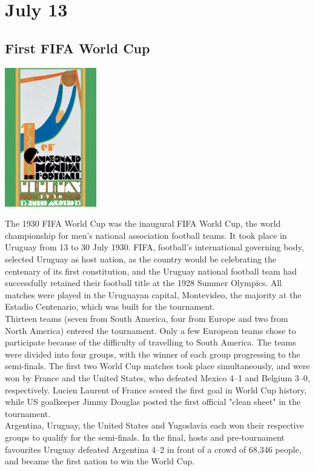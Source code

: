 \documentclass[11pt]{report}
\begin{document}
\section{July 13}
\subsection{First FIFA World Cup}
\vspace{2mm}\begin{center}\includegraphics[width=4cm]{./img/fifa1930.jpg}\end{center}
The 1930 FIFA World Cup was the inaugural FIFA World Cup, the world championship for men's national association football teams. It took place in Uruguay from 13 to 30 July 1930. FIFA, football's international governing body, selected Uruguay as host nation, as the country would be celebrating the centenary of its first constitution, and the Uruguay national football team had successfully retained their football title at the 1928 Summer Olympics. All matches were played in the Uruguayan capital, Montevideo, the majority at the Estadio Centenario, which was built for the tournament.\\
\indent Thirteen teams (seven from South America, four from Europe and two from North America) entered the tournament. Only a few European teams chose to participate because of the difficulty of travelling to South America. The teams were divided into four groups, with the winner of each group progressing to the semi-finals. The first two World Cup matches took place simultaneously, and were won by France and the United States, who defeated Mexico 4–1 and Belgium 3–0, respectively. Lucien Laurent of France scored the first goal in World Cup history, while US goalkeeper Jimmy Douglas posted the first official "clean sheet" in the tournament.\\
\indent Argentina, Uruguay, the United States and Yugoslavia each won their respective groups to qualify for the semi-finals. In the final, hosts and pre-tournament favourites Uruguay defeated Argentina 4–2 in front of a crowd of 68,346 people, and became the first nation to win the World Cup.
\end{document}
